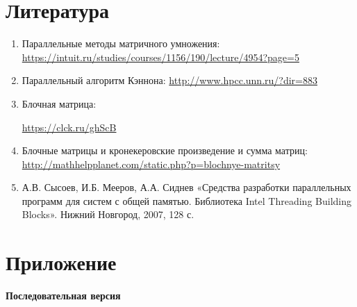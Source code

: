 \documentclass{report}
\begin{document}
\section*{Литература}
\begin{enumerate}
\item Параллельные методы матричного умножения: \newline \url{https://intuit.ru/studies/courses/1156/190/lecture/4954?page=5}
\item Параллельный алгоритм Кэннона: \newline \url{http://www.hpcc.unn.ru/?dir=883}
\item Блочная матрица: 

\url{https://clck.ru/ghScB}

\item Блочные матрицы и кронекеровские произведение и сумма матриц: \newline 
\url{http://mathhelpplanet.com/static.php?p=blochnye-matritsy}
\item А.В. Сысоев, И.Б. Мееров, А.А. Сиднев «Средства разработки параллельных программ для систем с общей памятью. Библиотека Intel Threading Building Blocks». Нижний Новгород, 2007, 128 с. 
\end{enumerate} 
\newpage

\section*{Приложение}
\textbf{Последовательная версия}
\end{document}
